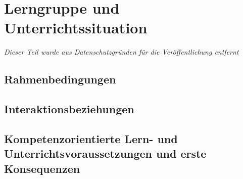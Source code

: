 
\section{Lerngruppe und Unterrichtssituation}

\emph{Dieser Teil wurde aus Datenschutzgründen für die Veröffentlichung entfernt}

\subsection{Rahmenbedingungen}


\subsection{Interaktionsbeziehungen}


\subsection{Kompetenzorientierte Lern- und Unterrichtsvoraussetzungen und erste Konsequenzen}
